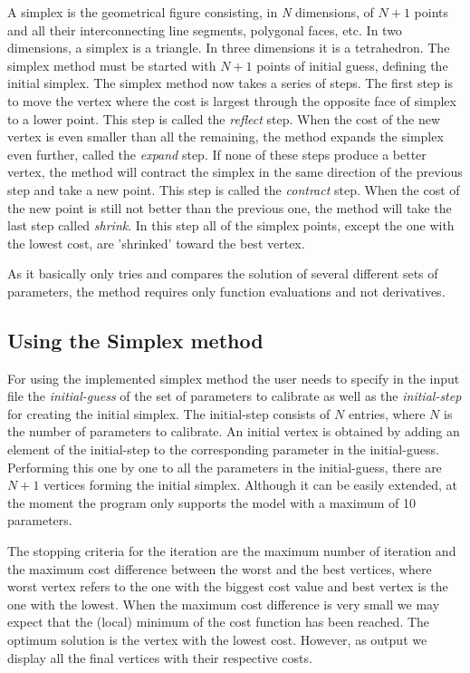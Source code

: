 A simplex is the geometrical figure consisting, in \emph{N} dimensions, of
$N+1$ points and all their interconnecting line segments, polygonal faces,
etc. In two dimensions, a simplex is a triangle. In three dimensions it is
a tetrahedron. The simplex method must be started with $N+1$ points of
initial guess, defining the initial simplex. The simplex method now takes a
series of steps. The first step is to move the vertex where the cost is
largest through the opposite face of simplex to a lower point. This step is
called the \emph{reflect} step. When the cost of the new vertex is even
smaller than all the remaining, the method expands the simplex even
further, called the \emph{expand} step. If none of these steps produce a 
better vertex, the method will contract the simplex in the same direction
of the previous step and take a new point. This step is called the
\emph{contract} step. When the cost of the new point is still not better
than the previous one, the method will take the last step called
\emph{shrink}. In this step all of the simplex points, except the one with
the lowest cost, are 'shrinked' toward the best vertex.

As it basically only tries and compares the solution of several different
sets of parameters, the method requires only function evaluations and not
derivatives.

\subsection{Using the Simplex method}
For using the implemented simplex method the user needs to specify in the
input file the \emph{initial-guess} of the set of parameters to calibrate
as well as the \emph{initial-step} for creating the initial simplex. The
initial-step consists of $N$ entries, where $N$ is the number of parameters
to calibrate. An initial vertex is obtained by adding an element of the
initial-step to the corresponding parameter in the initial-guess.
Performing this one by one to all the parameters in the initial-guess,
there are $N+1$ vertices forming the initial simplex. Although it can be
easily extended, at the moment the program only supports the model with
a maximum of 10 parameters.

The stopping criteria for the iteration are the maximum number of iteration
and the maximum cost difference between the worst and the best vertices,
where worst vertex refers to the one with the biggest cost value and best
vertex is the one with the lowest. When the maximum cost difference is very
small we may expect that the (local) minimum of the cost function has been
reached. The optimum solution is the vertex with the lowest cost. However,
as output we display all the final vertices with their respective costs.

